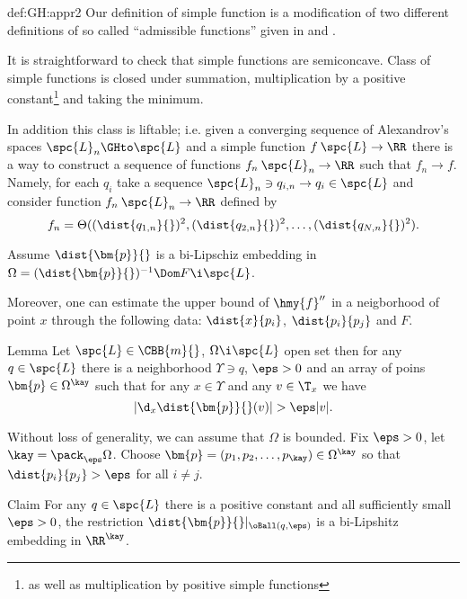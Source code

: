 {\begin{subthm}{def:GH:appr2}
Our definition of simple function is a modification of two different definitions of so called ``admissible functions'' given in
\cite[3.2]{perelman:morse} and \cite[5.1]{kapovitch:stability}. 


It is straightforward to check that simple functions are semiconcave. Class of simple functions is
closed under summation, multiplication by a positive constant\footnote{as
well as multiplication by positive simple functions} and taking the minimum.

In addition this class is liftable; i.e. given a converging sequence of
Alexandrov's spaces $\spc{L}_n\GHto \spc{L}$ and a simple function $f\:\spc{L}\to\RR$ there is a
way to construct a sequence of functions $f_n\:\spc{L}_n\to\RR$ such that $f_n\to f$.
Namely, for each $q_i$ take a sequence $\spc{L}_n\ni q_{i,n}\to q_i\in \spc{L}$ and consider
function $f_n\:\spc{L}_n\to\RR$ defined by
$$f_n=\Theta((\dist{q_{1,n}}{})^2,(\dist{q_{2,n}}{})^2,\dots,(\dist{q_{N,n}}{})^2).$$











Assume $\dist{\bm{p}}{}$ is a bi-Lipschiz embedding in $\Omega=(\dist{\bm{p}}{})^{-1}\Dom F\i \spc{L}$.



Moreover, one can estimate the upper bound of $\hmy{f}''$ in a neigborhood of point $x$ through the following data: $\dist{x}{p_i}$, $\dist{p_i}{p_j}$ and $F$.

\begin{thm}{Lemma}
Let $\spc{L}\in \CBB{m}{}$, $\Omega\i\spc{L}$ open set
then for any $q\in \spc{L}$ there is a neighborhood $\Upsilon\ni q$, $\eps>0$ and an array of poins $\bm{p}\in\Omega^\kay$ such that 
for any $x\in \Upsilon$ and any $v\in \T_x$ we have 
$$|\d_x\dist{\bm{p}}{}(v)|>\eps|v|.$$
\end{thm}

Without loss of generality, we can assume that $\Omega$ is bounded.
Fix $\eps>0$, let $\kay=\pack_\eps\Omega$.
Choose $\bm{p}=(p_1,p_2,\dots,p_\kay)\in\Omega^\kay$ so that $\dist{p_i}{p_j}>\eps$ for all $i\not=j$.

\begin{clm}{Claim}
For any $q\in\spc{L}$ there is a positive constant and all sufficiently small $\eps>0$, 
the restriction $\dist{\bm{p}}{}|_{\oBall(q,\eps)}$ is a bi-Lipshitz embedding in $\RR^\kay$.
\end{clm}


\end{subthm}}
